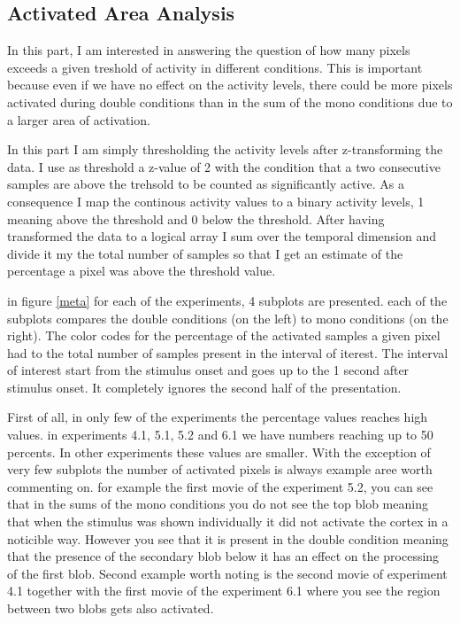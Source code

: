 	\subsection{Activated Area Analysis} 
 
\label{oi_local_area}

In this part, I am interested in answering the question of how many pixels
exceeds a given treshold of activity in different conditions.  This is
important because even if we have no effect on the activity levels, there
could be more pixels activated during double conditions than in the sum of
the mono conditions due to a larger area of activation.  



In this part I am simply thresholding the activity levels after
z-transforming the data. I use as threshold a z-value of 2 with the
condition that a two consecutive samples are above the trehsold to be
counted as significantly active. As a consequence I map the continous
activity values to a binary activity levels, 1 meaning above the threshold
and 0 below the threshold. After having transformed the data to a logical
array I sum over the temporal dimension and divide it my the total number
of samples so that I get an estimate of the percentage a pixel was above
the threshold value.


in figure \ref{meta} for each of the experiments, 4 subplots are presented.
each of the subplots compares the double conditions (on the left) to mono
conditions (on the right). The color codes for the percentage of the
activated samples a given pixel had to the total number of samples present
in the interval of iterest. The interval of interest start from the
stimulus onset and goes up to the 1 second after stimulus onset. It
completely ignores the second half of the presentation.



First of all, in only few of the experiments the percentage values reaches
high values. in experiments 4.1, 5.1, 5.2 and 6.1 we have numbers reaching
up to 50 percents. In other experiments these values are smaller. With the
exception of very few subplots the number of activated pixels is always
example aree worth commenting on. for example the first movie of the
experiment 5.2, you can see that in the sums of the mono conditions you do
not see the top blob meaning that when the stimulus was shown individually
it did not activate the cortex in a noticible way. However you see that it
is present in the double condition meaning that the presence of the
secondary blob below it has an effect on the processing of the first blob.
Second example worth noting is the second movie of experiment 4.1 together
with the first movie of the experiment 6.1 where you see the region between
two blobs gets also activated.

